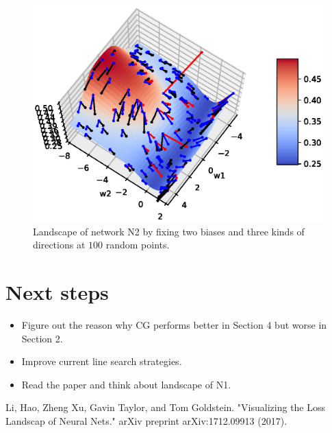 \documentclass[12pt]{article}
\begin{document}
\begin{figure}[t]
\includegraphics[width=15cm]{2w.eps}
\caption{Landscape of network N2 by fixing two biases and three kinds of directions at $100$ random points.}
\label{fig:landscape}
\end{figure}

\section{Next steps}
\begin{itemize}
\item Figure out the reason why CG performs better in Section 4 but worse in Section 2.
\item Improve current line search strategies.
\item Read the paper \cite{rr} and think about landscape of N1.
\end{itemize}

\begin{thebibliography}{9}
Li, Hao, Zheng Xu, Gavin Taylor, and Tom Goldstein. 
"Visualizing the Loss Landscap of Neural Nets." arXiv preprint arXiv:1712.09913 (2017). 
\end{thebibliography}
\end{document}
